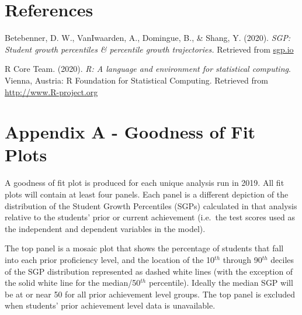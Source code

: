 \documentclass[12pt]{article}
\newlength{\cslhangindent}
\newenvironment{cslreferences}%
{\setlength{\parindent}{0pt}%
\everypar{\setlength{\hangindent}{\cslhangindent}}\ignorespaces}%
{\par}
\begin{document}
\pagebreak

\hypertarget{references}{%
\section*{References}\label{references}}

\hypertarget{refs}{}
\begin{cslreferences}
\leavevmode\hypertarget{ref-sgp2020}{}%
Betebenner, D. W., VanIwaarden, A., Domingue, B., \& Shang, Y. (2020).
\emph{SGP: Student growth percentiles \& percentile growth
trajectories.} Retrieved from \url{sgp.io}

\leavevmode\hypertarget{ref-Rsoftware}{}%
R Core Team. (2020). \emph{{{R}}: A language and environment for
statistical computing}. Vienna, Austria: R Foundation for Statistical
Computing. Retrieved from \url{http://www.R-project.org}
\end{cslreferences}

\pagebreak

\renewcommand{\thesection}{A}
\titleformat{\section}{\normalfont\Large\bfseries}{}{0pt}{}
\renewcommand*{\thepage}{\thesection\arabic{page}}

\hypertarget{appendices}{%
\section{Appendix A - Goodness of Fit Plots}\label{appendices}}

A goodness of fit plot is produced for each unique analysis run in 2019.
All fit plots will contain at least four panels. Each panel is a
different depiction of the distribution of the Student Growth
Percentiles (SGPs) calculated in that analysis relative to the students'
prior or current achievement (i.e.~the test scores used as the
independent and dependent variables in the model).

The top panel is a mosaic plot that shows the percentage of students
that fall into each prior proficiency level, and the location of the
10\(^{th}\) through 90\(^{th}\) deciles of the SGP distribution
represented as dashed white lines (with the exception of the solid white
line for the median/50\(^{th}\) percentile). Ideally the median SGP will
be at or near 50 for all prior achievement level groups. The top panel
is excluded when students' prior achievement level data is unavailable.
\end{document}
